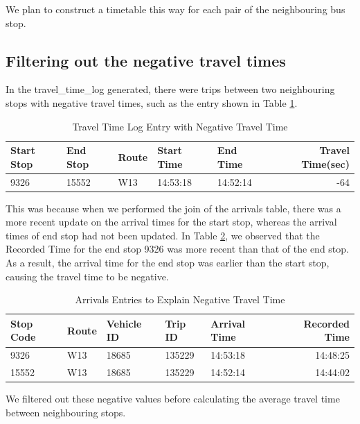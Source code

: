 \par We plan to construct a timetable this way for each pair of the neighbouring bus stop.

\subsection{Filtering out the negative travel times}
\par In the travel\_time\_log generated, there were trips between two neighbouring stops with negative travel times, such as the entry shown in Table \ref{table:travel_time_log_negative}.

\begin{table}
\centering
\begin{tabular}{@{}lllllr@{}} \toprule
Start Stop & End Stop & Route & Start Time & End Time & Travel Time(sec) \\ \midrule
9326 & 15552 & W13 & 14:53:18 & 14:52:14 & -64 \\ \bottomrule
\end{tabular}
\caption{Travel Time Log Entry with Negative Travel Time}
\label{table:travel_time_log_negative}
\end{table}

\par This was because when we performed the join of the arrivals table, there was a more recent update on the arrival times for the start stop, whereas the arrival times of end stop had not been updated. In Table \ref{table:negative_travel_time_explained}, we observed that the Recorded Time for the end stop 9326 was more recent than that of the end stop. As a result, the arrival time for the end stop was earlier than the start stop, causing the travel time to be negative.

\begin{table}
\centering
\begin{tabular}{@{}lllllr@{}} \toprule
Stop Code & Route & Vehicle ID & Trip ID & Arrival Time & Recorded Time\\ \midrule
9326 & W13 & 18685 & 135229 &  14:53:18 & 14:48:25 \\ [0.4cm]
15552 & W13 & 18685 & 135229 & 14:52:14 & 14:44:02 \\ \bottomrule
\end{tabular}
\caption{Arrivals Entries to Explain Negative Travel Time}
\label{table:negative_travel_time_explained}
\end{table}

\par We filtered out these negative values before calculating the average travel time between neighbouring stops.

